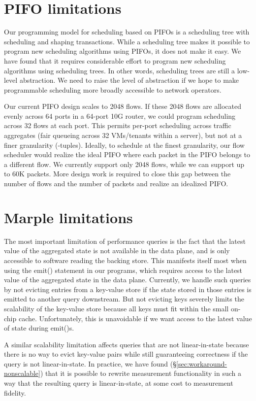 \section{PIFO limitations}
\label{sec:pifo_limitations}

Our programming model for scheduling based on PIFOs is a scheduling tree with
scheduling and shaping transactions. While a scheduling tree makes it possible
to program new scheduling algorithms using PIFOs, it does not make it easy. We
have found that it requires considerable effort to program new scheduling
algorithms using scheduling trees.  In other words, scheduling trees are still
a low-level abstraction. We need to raise the level of abstraction if we hope
to make programmable scheduling more broadly accessible to network operators.

Our current PIFO design scales to 2048 flows. If these 2048 flows are allocated
evenly across 64 ports in a 64-port 10G router, we could program scheduling
across 32 flows at each port. This permits per-port scheduling across traffic
aggregates (\eg fair queueing across 32 VMs/tenants within a server), but not
at a finer granularity (-tuples). Ideally, to schedule at the finest
granularity, our flow scheduler would realize the ideal PIFO where each packet
in the PIFO belongs to a different flow. We currently support only 2048 flows,
while we can support up to 60K packets.  More design work is required to close
this gap between the number of flows and the number of packets and realize an
idealized PIFO.

\section{Marple limitations}
\label{sec:pq_limitations}

The most important limitation of performance queries is the fact that the
latest value of the aggregated state is not available in the data plane, and is
only accessible to software reading the backing store. This manifests itself
most when using the {\ct emit()} statement in our programs, which requires
access to the latest value of the aggregated state in the data plane.
Currently, we handle such queries by not evicting entries from a key-value
store if the state stored in those entries is emitted to another query
downstream. But not evicting keys severely limits the scalability of the
key-value store because all keys must fit within the small on-chip cache.
Unfortunately, this is unavoidable if we want access to the latest value of
state during {\ct emit()}s.

A similar scalability limitation affects queries that are not linear-in-state
because there is no way to evict key-value pairs while still guaranteeing
correctness if the query is not linear-in-state. In practice, we have found
(\S\ref{sec:workaround-nonscalable}) that it is possible to rewrite measurement
functionality in such a way that the resulting query is linear-in-state, at
some cost to measurement fidelity.
